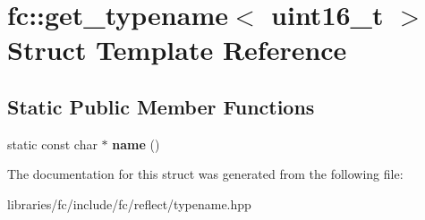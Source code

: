 \hypertarget{structfc_1_1get__typename_3_01uint16__t_01_4}{}\section{fc\+:\+:get\+\_\+typename$<$ uint16\+\_\+t $>$ Struct Template Reference}
\label{structfc_1_1get__typename_3_01uint16__t_01_4}
\subsection*{Static Public Member Functions}
\begin{DoxyCompactItemize}
\item 
\mbox{\label{structfc_1_1get__typename_3_01uint16__t_01_4_a0588a3125e6e1cffe62820eb76e5a4c8}} 
static const char $\ast$ {\bfseries name} ()
\end{DoxyCompactItemize}


The documentation for this struct was generated from the following file\+:\begin{DoxyCompactItemize}
\item 
libraries/fc/include/fc/reflect/typename.\+hpp\end{DoxyCompactItemize}
